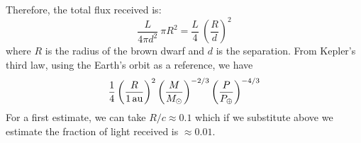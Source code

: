 \documentclass[10pt,a4paper]{article}
\begin{document}
Therefore, the total flux received is:
\begin{equation}
\frac{L}{4 \pi d^2} \ \pi R^2 = \frac{L}{4} \ \left(\frac{R}{d}\right)^2
\end{equation}
where $R$ is the radius of the brown dwarf and $d$ is the separation.
From Kepler's third law, using the Earth's orbit as a reference, we have
\begin{equation}
  \frac{1}{4} \left(\frac{R}{\rm 1\,au}\right)^2
  \left(\frac{M}{M_{\odot}}\right)^{-2/3}
  \left(\frac{P}{P_{\oplus}}\right)^{-4/3}
\end{equation}
For a first estimate, we can take $R/c \approx 0.1$ which if we
substitute above we estimate the fraction of light received is
$\approx 0.01$.



\end{document}
